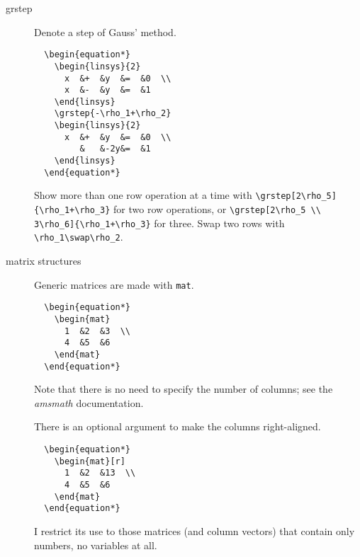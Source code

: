 \documentclass[titlepage]{article}
\begin{document}
\begin{description}
\item[grstep]
  Denote a step of Gauss' method.
\begin{verbatim}
  \begin{equation*}
    \begin{linsys}{2}
      x  &+  &y  &=  &0  \\
      x  &-  &y  &=  &1
    \end{linsys}
    \grstep{-\rho_1+\rho_2}
    \begin{linsys}{2}
      x  &+  &y  &=  &0  \\
         &   &-2y&=  &1
    \end{linsys}
  \end{equation*}
\end{verbatim}
  Show more than one row operation at a time with
  \verb|\grstep[2\rho_5]{\rho_1+\rho_3}| for two row operations,
  or \verb|\grstep[2\rho_5 \\ 3\rho_6]{\rho_1+\rho_3}| for three.
  Swap two rows with \verb|\rho_1\swap\rho_2|.
  
\item[matrix structures]
Generic matrices are made with \verb|mat|. 
\begin{verbatim}
  \begin{equation*}
    \begin{mat}
      1  &2  &3  \\
      4  &5  &6 
    \end{mat}
  \end{equation*}
\end{verbatim}
  Note that there is no need to specify the number of columns;
  see the \textit{amsmath} documentation.

  There is an optional argument to make the columns right-aligned.
\begin{verbatim}
  \begin{equation*}
    \begin{mat}[r]
      1  &2  &13  \\
      4  &5  &6 
    \end{mat}
  \end{equation*}
\end{verbatim}
I restrict its use to those matrices (and column vectors) that contain
only numbers, no variables at all.


\end{description}
\end{document}
